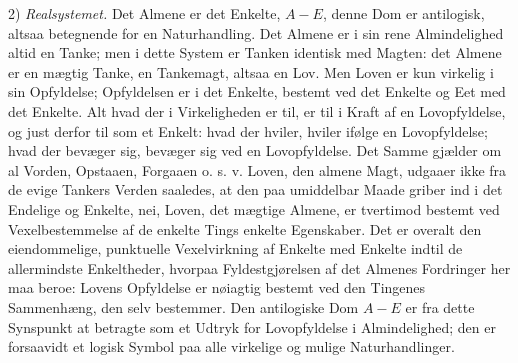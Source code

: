 \documentclass[11pt]{book}
\begin{document}
2) \emph{Realsystemet.} Det Almene er det Enkelte, $A - E$, denne Dom er
antilogisk, altsaa betegnende for en Naturhandling. Det Almene er i sin
rene Almindelighed altid en Tanke; men i dette System er Tanken identisk
med Magten: det Almene er en mægtig Tanke, en Tankemagt, altsaa en Lov.
Men Loven er kun virkelig i sin Opfyldelse; Opfyldelsen er i det Enkelte,
bestemt ved det Enkelte og Eet med det Enkelte. Alt hvad der i
Virkeligheden er til, er til i Kraft af en Lovopfyldelse, og just derfor
til som et Enkelt: hvad der hviler, hviler ifølge en Lovopfyldelse; hvad
der bevæger sig, bevæger sig ved en Lovopfyldelse. Det Samme gjælder om
al Vorden, Opstaaen, Forgaaen o. s. v. Loven, den almene Magt, udgaaer
ikke fra de evige Tankers Verden saaledes, at den paa umiddelbar Maade
griber ind i det Endelige og Enkelte, nei, Loven, det mægtige Almene, er
tvertimod bestemt ved Vexelbestemmelse af de enkelte Tings enkelte
Egenskaber. Det er overalt den eiendommelige, punktuelle Vexelvirkning af
Enkelte med Enkelte indtil de allermindste Enkeltheder, hvorpaa
Fyldestgjørelsen af det Almenes Fordringer her maa beroe: Lovens
Opfyldelse er nøiagtig bestemt ved den Tingenes Sammenhæng, den selv
bestemmer. Den antilogiske Dom $A - E$ er fra dette Synspunkt at betragte
som et Udtryk for Lovopfyldelse i Almindelighed; den er forsaavidt et
logisk Symbol paa alle virkelige og mulige Naturhandlinger.
\end{document}
